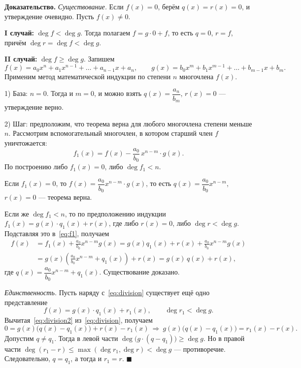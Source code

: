 \documentclass[12pt,a4paper]{article}
\newenvironment{myproof}{\noindent\textbf{Доказательство.}}{\hfill$\blacksquare$}
\begin{document}
\begin{myproof}
  \textit{Существование.} Если $f(x) = 0$, берём $q(x) = r(x) = 0$, и
  утверждение очевидно. Пусть $f(x) \neq 0$.

  \textbf{I случай:} $\deg f < \deg g$. Тогда полагаем
  $f = g \cdot 0 + f$, то есть $q = 0$, $r = f$, причём
  $\deg r = \deg f < \deg g$.

  \textbf{II случай:} $\deg f \ge \deg g$. Запишем
  \[
    f(x) = a_0 x^n + a_1 x^{n-1} + \dots + a_{n-1} x + a_n, \qquad
    g(x) = b_0 x^m + b_1 x^{m-1} + \dots + b_{m-1} x + b_m.
  \]
  Применим метод математической индукции по степени $n$ многочлена
  $f(x)$.

1) База: $n = 0$. Тогда и $m = 0$, и можно взять
$q(x) = \dfrac{a_n}{b_m}$, $r(x) = 0$ — утверждение верно.

2) Шаг: предположим, что теорема верна для любого многочлена степени
меньше $n$. Рассмотрим вспомогательный многочлен, в котором старший
член $f$ уничтожается:
\begin{equation}
f_1(x) = f(x) - \frac{a_0}{b_0}\, x^{n-m} \cdot g(x).
\tag{13.2} \label{eq:f1}
\end{equation}
По построению либо $f_1(x) = 0$, либо $\deg f_1 < n$.

Если $f_1(x) = 0$, то $f(x) = \dfrac{a_0}{b_0} x^{n-m} \cdot g(x)$,
то есть $q(x) = \dfrac{a_0}{b_0} x^{n-m}$, $r(x) = 0$ — теорема верна.

Если же $\deg f_1 < n$, то по предположению индукции
$f_1(x) = g(x)\cdot q_1(x) + r(x)$, где либо $r(x) = 0$, либо
$\deg r < \deg g$. Подставляя это в~\eqref{eq:f1}, получаем
\begin{align*}
f(x) &= f_1(x) + \frac{a_0}{b_0} x^{n-m} g(x)
= g(x) q_1(x) + r(x) + \frac{a_0}{b_0} x^{n-m} g(x) \\
&= g(x)\left( \frac{a_0}{b_0} x^{n-m} + q_1(x) \right) + r(x)
= g(x)\, q(x) + r(x),
\end{align*}
где $q(x) = \dfrac{a_0}{b_0} x^{n-m} + q_1(x)$. Существование доказано.

\medskip
\textit{Единственность.} Пусть наряду с~\eqref{eq:division}
существует ещё одно представление
\begin{equation}
f(x) = g(x) \cdot q_1(x) + r_1(x), \qquad \deg r_1 < \deg g.
\tag{13.3} \label{eq:division2}
\end{equation}
Вычитая~\eqref{eq:division2} из~\eqref{eq:division}, получаем
\[
0 = g(x)\bigl(q(x) - q_1(x)\bigr) + r(x) - r_1(x)
\ \Longrightarrow\
g(x)\bigl(q(x) - q_1(x)\bigr) = r_1(x) - r(x).
\]
Допустим $q \neq q_1$. Тогда в левой части
$\deg\bigl(g\cdot(q - q_1)\bigr) \ge \deg g$. Но в правой части
$\deg(r_1 - r) \le \max(\deg r_1, \deg r) < \deg g$ — противоречие.
Следовательно, $q = q_1$, а тогда и $r_1 = r$.
\end{myproof}
\end{document}
